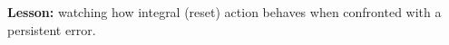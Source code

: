 












{\bf Lesson:} watching how integral (reset) action behaves when confronted with a persistent error.




